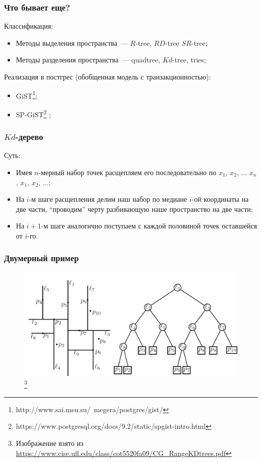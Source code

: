 \documentclass{beamer}
\begin{document}
\begin{frame}
\frametitle{Что бывает еще?}

Классификация:

\begin{itemize}
  \setlength\itemsep{1em}
  \item Методы выделения пространства~--- $R$-tree, $RD$-tree $SR$-tree;
  \item Методы разделения пространства~--- quadtree, $Kd$-tree, tries;
\end{itemize}

Реализация в постгрес (обобщенная модель с транзакционностью):
\begin{itemize}
  \setlength\itemsep{1em}
  \item GiST\footnote{http://www.sai.msu.su/~megera/postgres/gist/};
  \item SP-GiST\footnote{https://www.postgresql.org/docs/9.2/static/spgist-intro.html} \cite{Eltabakh2006};
\end{itemize}


\end{frame}

\begin{frame}
\frametitle{$Kd$-дерево}
Суть:
\begin{itemize}
  \setlength\itemsep{1em}
  \item Имея $n$-мерный набор точек расщепляем его последовательно по $x_1$, $x_2$, $\ldots$ $x_n$, $x_1$, $x_2$, $\ldots$;
  \item На $i$-м шаге расщепления делим наш набор по медиане $i$-ой координаты на две части, ``проводим'' черту разбивающую наше пространство на две части;
  \item На $i+1$-м шаге аналогично поступаем с каждой половиной точек оставшейся от $i$-го.
  
\end{itemize}

\end{frame}

\begin{frame}
\frametitle{Двумерный пример}

\begin{figure}[htb]
\includegraphics[width=\textwidth,height=0.8\textheight,keepaspectratio]{ex1.png} 
\footnote{\tiny{Изображение взято из \url{https://www.cise.ufl.edu/class/cot5520fa09/CG_RangeKDtrees.pdf}}}
\end{figure}   

\end{frame}
\end{document}
